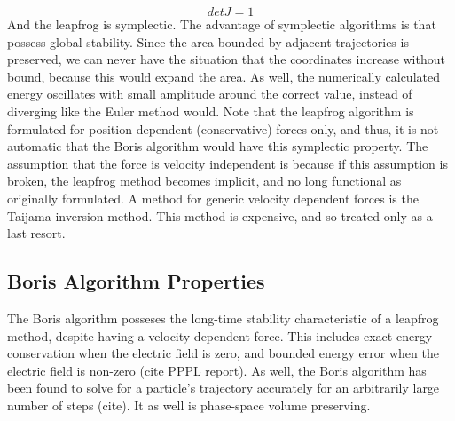\documentclass[12pt]{article}
\begin{document}
$$detJ=1$$
And the leapfrog is symplectic. The advantage of symplectic algorithms is that possess global stability. Since the area bounded by adjacent trajectories is preserved, we can never have the situation that the coordinates increase without bound, because this would expand the area. As well, the numerically calculated energy oscillates with small amplitude around the correct value, instead of diverging like the Euler method would. Note that the leapfrog algorithm is formulated for position dependent (conservative) forces only, and thus, it is not automatic that the Boris algorithm would have this symplectic property. The assumption that the force is velocity independent is because if this assumption is broken, the leapfrog method becomes implicit, and no long functional as originally formulated. A method for generic velocity dependent forces is the Taijama inversion method. This method is expensive, and so treated only as a last resort. 
\subsection{Boris Algorithm Properties}
The Boris algorithm posseses the long-time stability characteristic of a leapfrog method, despite having a velocity dependent force. This includes exact energy conservation when the electric field is zero, and bounded energy error when the electric field is non-zero (cite PPPL report). As well, the Boris algorithm has been found to solve for a particle's trajectory accurately for an arbitrarily large number of steps (cite). It as well is phase-space volume preserving. 
\end{document}
